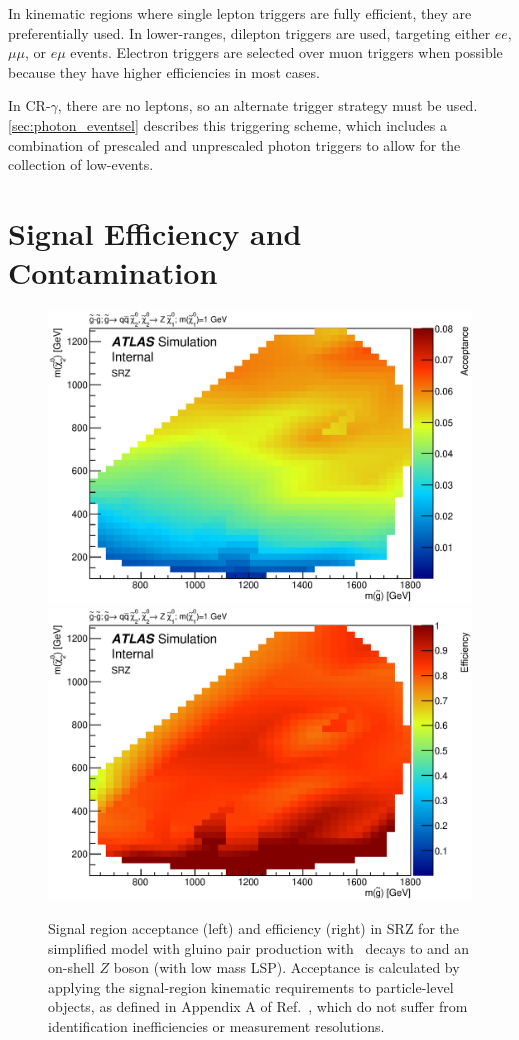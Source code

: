 In kinematic regions where single lepton triggers are fully efficient, they are preferentially used. In lower-\pt ranges, dilepton triggers are used, targeting either $ee$, $\mu\mu$, or $e\mu$ events. Electron triggers are selected over muon triggers when possible because they have higher efficiencies in most cases.

In CR-$\gamma$, there are no leptons, so an alternate trigger strategy must be used. \autoref{sec:photon_eventsel} describes this triggering scheme, which includes a combination of prescaled and unprescaled photon triggers to allow for the collection of low-\pt \gjets events. 


\section{Signal Efficiency and Contamination}

\begin{figure}[ht]
\centering
\includegraphics[width=.48\textwidth]{figures/signalacceptcontam/acc_SM_GG_N2_1.eps}
\includegraphics[width=.48\textwidth]{figures/signalacceptcontam/eff_SM_GG_N2_1.eps}
\caption{
Signal region acceptance (left) and efficiency (right) in SRZ for the simplified model with gluino pair production with \chitwozero\ decays to \chionezero and an on-shell $Z$ boson (with low mass LSP).  
Acceptance is calculated by applying the signal-region kinematic requirements to particle-level objects, as defined in Appendix A of Ref.~\cite{SUSY-2013-19}, which do not suffer from identification inefficiencies or measurement resolutions.
}
\label{fig:acc_SMGGN2_1_z}
\end{figure}

